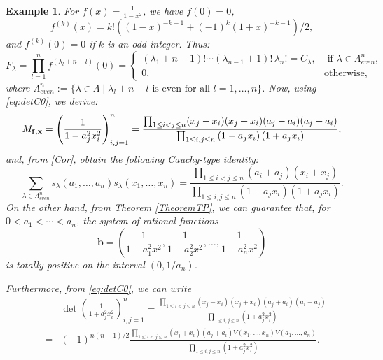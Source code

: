 \documentclass[smallextended]{svjour3}       %
\newtheorem{exmp}{Example}
\begin{document}
\begin{exmp}
     For   
    \(f(x)=\frac{1}{1-x^2}\),  we have $f(0)=0$,  
    \[
    f^{(k)}(x)= k!  \left( (1-x)^{-k-1} + (-1)^k (1+x)^{-k-1} \right)/2,
    \] 
    and $f^{(k)}(0)=0$ if $k$ is an odd integer.  Thus:
         \begin{equation*}
                 F_\lambda= \prod_{l=1}^n  f^{(\lambda_l+n-l)}(0)=\begin{cases}  (\lambda_1+n-1)!\cdots  (\lambda_{n-1}+1)! \, \lambda_n!=C_\lambda,  & \textrm{ if }  \lambda \in \Lambda^n_{even}, \\ 0, & \textrm{otherwise},  \end{cases}    
    \end{equation*}
where     \( \Lambda^n_{even} := \{ \lambda \in  \Lambda \mid \lambda_l + n - l \textrm{ is even for all } l = 1, \dots, n\}\).
Now, using \eqref{eq:detC0}, we derive:
  \[ 
           M_{\bf f,  \bf x}=\left( \frac{1}{1-a^2_jx^2_i}\right)_{i,j=1}^n 
           = \frac{    \prod_{1\le i < j \le n } (x_j -x_i )  (x_j+x_i)  (a_j -a_i ) (a_j+a_i  ) }{  \prod_{1\le i , j \le n} \left(1- a_j  x_i  \right) \left(1+ a_j  x_i \right) },
  \]
and,  from \eqref{Cor},   obtain the following Cauchy-type identity:
    \begin{equation}\label{minusx2}
      \sum_{\lambda \in \Lambda^n_{even}}  s_\lambda(a_1,\dots,a_n)s_\lambda(x_1,\dots,x_n)=\frac{ \prod_{1\le i < j \le n }(a_i+a_j)(x_i+x_j)}{\prod_{1\le i , j \le n }(1-a_jx_i) (1+a_jx_i)}.
    \end{equation}
On the other hand, from Theorem \ref{TheoremTP}, we can guarantee that,  for $0<a_1<\cdots<a_n$,  the system of rational functions 
$$
{\mathbf b}=\left( \frac{1}{1-a_1^2x^2}, \frac{1}{1-a_2^2x^2},\ldots , \frac{1}{1-a_n^2x^2}\right)
$$
 is totally positive on the interval $(0,1/a_n)$.


Furthermore, from \eqref{eq:detC0}, we can write 
\begin{eqnarray*} \label{eq:colocacionEj4}
   &&\det \left( \frac{1}{1+a^2_jx^2_i}\right)_{i,j=1}^n=  
      \frac{   \prod_{1\le i< j \le n} (x_j-x_i)(x_j+x_i) (a_j+a_i)(a_i-a_j)}{\prod_{1\le i , j \le n} (1+a_j^2x_i^2)}\\ 
      &=& (-1)^{n(n-1)/2}   
      \frac{   \prod_{1\le i< j \le n} (x_j+x_i) (a_j+a_i) V( x_1,\dots,x_n)  V( a_1,\dots,a_n)}{\prod_{1\le i , j \le n} (1+a_j^2x_i^2)}.
 \end{eqnarray*}


\end{exmp}
\end{document}
